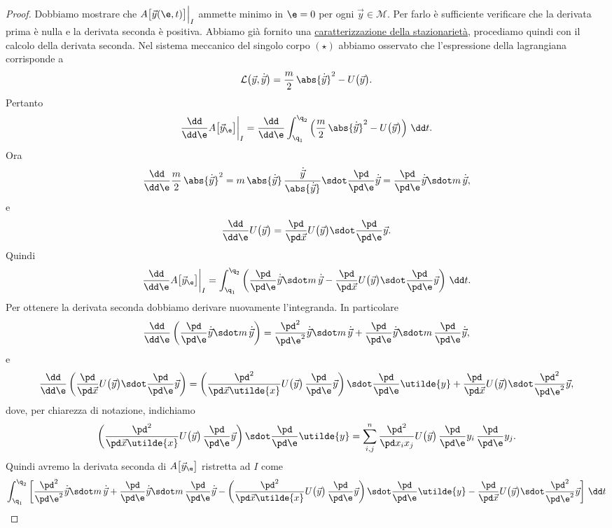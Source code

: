 \begin{proof}
	Dobbiamo mostrare che \(A\big[\vec{y}(\e,t)\big]\Big|_I\) ammette minimo in \(\e=0\) per ogni \(\vec{y}\in \mathcal{M}\).
	Per farlo è sufficiente verificare che la derivata prima è nulla e la derivata seconda è positiva.
	Abbiamo già fornito una \hyperref[th:caratterizzazioneStazionarietàFunzionale]{caratterizzazione della stazionarietà}, procediamo quindi con il calcolo della derivata seconda.
	Nel sistema meccanico del singolo corpo \((\star)\) abbiamo osservato che l'espressione della lagrangiana corrisponde a
	\[
		\mathcal{L}\big(\vec{y},\dot{\vec{y}}\big) = \frac{m}{2}\,\abs{\dot{\vec{y}}}^2 - U\big(\vec{y}\big).
	\]
	Pertanto
	\[
		\frac{\dd}{\dd \e}A\big[\vec{y}_\e\big]\bigg|_I = \frac{\dd}{\dd\e} \int_{\q_1}^{\q_2} \left(\frac{m}{2}\,\abs{\dot{\vec{y}}}^2 - U\big(\vec{y}\big)\right)\,\dd t.
	\]
	Ora
	\[
		\frac{\dd}{\dd\e} \frac{m}{2}\,\abs{\dot{\vec{y}}}^2 = m\,\abs{\dot{\vec{y}}}\,\frac{\dot{\vec{y}}}{\abs{\dot{\vec{y}}}} \sdot \frac{\pd}{\pd \e}\dot{\vec{y}} = \frac{\pd}{\pd\e}\dot{\vec{y}} \sdot m\,\dot{\vec{y}},
	\]
	e
	\[
		\frac{\dd}{\dd\e} U\big(\vec{y}\big) = \frac{\pd}{\pd\vec{x}}U\big(\vec{y}\big) \sdot \frac{\pd}{\pd\e} \vec{y}.
	\]
	Quindi
	\[
		\frac{\dd}{\dd \e}A\big[\vec{y}_\e\big]\bigg|_I = \int_{\q_1}^{\q_2} \left(\frac{\pd}{\pd\e}\dot{\vec{y}} \sdot m\,\dot{\vec{y}} - \frac{\pd}{\pd\vec{x}}U\big(\vec{y}\big) \sdot \frac{\pd}{\pd\e} \vec{y}\right)\,\dd t.
	\]
	Per ottenere la derivata seconda dobbiamo derivare nuovamente l'integranda. In particolare
	\[
		\frac{\dd}{\dd\e} \left(\frac{\pd}{\pd\e}\dot{\vec{y}} \sdot m\,\dot{\vec{y}}\right) = \frac{\pd^2}{\pd\e^2} \dot{\vec{y}} \sdot m\,\dot{\vec{y}} + \frac{\pd}{\pd\e}\dot{\vec{y}} \sdot m\,\frac{\pd}{\pd\e} \dot{\vec{y}},
	\]
	e
	\[
		\frac{\dd}{\dd\e}\left(\frac{\pd}{\pd\vec{x}}U\big(\vec{y}\big) \sdot \frac{\pd}{\pd\e} \vec{y}\right) = \left(\frac{\pd^2}{\pd\vec{x}\utilde{x}}U\big(\vec{y}\big)\,\frac{\pd}{\pd\e}\vec{y}\right) \sdot \frac{\pd}{\pd\e}\utilde{y} + \frac{\pd}{\pd\vec{x}}U\big(\vec{y}\big) \sdot \frac{\pd^2}{\pd\e^2}\vec{y},
	\]
	dove, per chiarezza di notazione, indichiamo
	\[
		\left(\frac{\pd^2}{\pd\vec{x}\utilde{x}}U\big(\vec{y}\big) \, \frac{\pd}{\pd\e}\vec{y}\right) \sdot \frac{\pd}{\pd\e}\utilde{y} = \sum_{i,j}^n \frac{\pd^2}{\pd x_i x_j}U\big(\vec{y}\big)\,\frac{\pd}{\pd \e}y_i \, \frac{\pd}{\pd\e} y_j.
	\]
	Quindi avremo la derivata seconda di \(A\big[\vec{y}_\e\big]\) ristretta ad \(I\) come
	\[
		\int_{\q_1}^{\q_2} \left[\frac{\pd^2}{\pd\e^2} \dot{\vec{y}} \sdot m\,\dot{\vec{y}} + \frac{\pd}{\pd\e}\dot{\vec{y}} \sdot m\,\frac{\pd}{\pd\e} \dot{\vec{y}} - \left(\frac{\pd^2}{\pd\vec{x}\utilde{x}}U\big(\vec{y}\big) \, \frac{\pd}{\pd\e}\vec{y}\right) \sdot \frac{\pd}{\pd\e}\utilde{y} - \frac{\pd}{\pd\vec{x}}U\big(\vec{y}\big) \sdot \frac{\pd^2}{\pd\e^2}\vec{y}\right]\,\dd t
\]
\end{proof}
